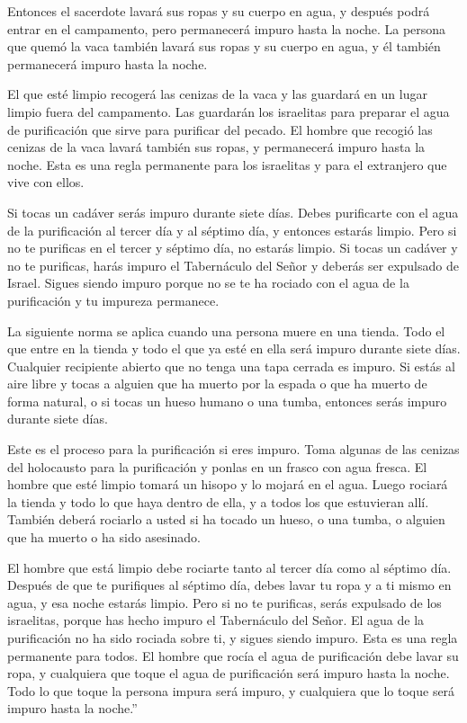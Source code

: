  Entonces el sacerdote lavará sus ropas y su cuerpo en agua,
y después podrá entrar en el campamento, pero permanecerá impuro hasta
la noche.  La persona que quemó la vaca también lavará sus
ropas y su cuerpo en agua, y él también permanecerá impuro hasta la
noche.

 El que esté limpio recogerá las cenizas de la vaca y las
guardará en un lugar limpio fuera del campamento. Las guardarán los
israelitas para preparar el agua de purificación que sirve para
purificar del pecado.  El hombre que recogió las cenizas de
la vaca lavará también sus ropas, y permanecerá impuro hasta la noche.
Esta es una regla permanente para los israelitas y para el extranjero
que vive con ellos.

 Si tocas un cadáver serás impuro durante siete días.
 Debes purificarte con el agua de la purificación al tercer
día y al séptimo día, y entonces estarás limpio. Pero si no te purificas
en el tercer y séptimo día, no estarás limpio.  Si tocas un
cadáver y no te purificas, harás impuro el Tabernáculo del Señor y
deberás ser expulsado de Israel. Sigues siendo impuro porque no se te ha
rociado con el agua de la purificación y tu impureza permanece.

 La siguiente norma se aplica cuando una persona muere en
una tienda. Todo el que entre en la tienda y todo el que ya esté en ella
será impuro durante siete días.  Cualquier recipiente
abierto que no tenga una tapa cerrada es impuro.  Si estás
al aire libre y tocas a alguien que ha muerto por la espada o que ha
muerto de forma natural, o si tocas un hueso humano o una tumba,
entonces serás impuro durante siete días.

 Este es el proceso para la purificación si eres impuro.
Toma algunas de las cenizas del holocausto para la purificación y ponlas
en un frasco con agua fresca.  El hombre que esté limpio
tomará un hisopo y lo mojará en el agua. Luego rociará la tienda y todo
lo que haya dentro de ella, y a todos los que estuvieran allí. También
deberá rociarlo a usted si ha tocado un hueso, o una tumba, o alguien
que ha muerto o ha sido asesinado.

 El hombre que está limpio debe rociarte tanto al tercer
día como al séptimo día. Después de que te purifiques al séptimo día,
debes lavar tu ropa y a ti mismo en agua, y esa noche estarás limpio.
 Pero si no te purificas, serás expulsado de los
israelitas, porque has hecho impuro el Tabernáculo del Señor. El agua de
la purificación no ha sido rociada sobre ti, y sigues siendo impuro.
 Esta es una regla permanente para todos. El hombre que
rocía el agua de purificación debe lavar su ropa, y cualquiera que toque
el agua de purificación será impuro hasta la noche.  Todo
lo que toque la persona impura será impuro, y cualquiera que lo toque
será impuro hasta la noche.''

